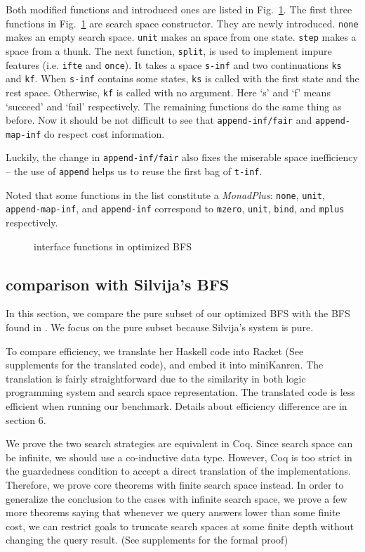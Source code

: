 \documentclass[format=acmlarge, review=true, authordraft=true]{acmart}
\begin{document}
Both modified functions and introduced ones are listed in Fig.~\ref{BFS-opt}. The first three functions in Fig.~\ref{BFS-opt} are search space constructor. They are newly introduced. \texttt{none} makes an empty search space. \texttt{unit} makes an space from one state. \texttt{step} makes a space from a thunk. The next function, \texttt{split}, is used to implement impure features (i.e. \texttt{ifte} and \texttt{once}). It takes a space \texttt{s-inf} and two continuations \texttt{ks} and \texttt{kf}. When \texttt{s-inf} contains some states, \texttt{ks} is called with the first state and the rest space. Otherwise, \texttt{kf} is called with no argument. Here `s' and `f' means `succeed' and `fail' respectively. The remaining functions do the same thing as before. Now it should be not difficult to see that \texttt{append-inf/fair} and \texttt{append-map-inf} do respect cost information.

Luckily, the change in \texttt{append-inf/fair} also fixes the miserable space inefficiency -- the use of \texttt{append} helps us to reuse the first bag of \texttt{t-inf}.

Noted that some functions in the list constitute a \emph{MonadPlus}: \texttt{none}, \texttt{unit}, \texttt{append-map-inf}, and \texttt{append-inf} correspond to \texttt{mzero}, \texttt{unit}, \texttt{bind}, and \texttt{mplus} respectively.

\begin{figure}
		
	\caption{interface functions in optimized BFS}
	\label{BFS-opt}
\end{figure}


\subsection{comparison with Silvija's BFS}

In this section, we compare the pure subset of our optimized BFS with the BFS found in \citep{seres1999algebra}. We focus on the pure subset because Silvija's system is pure. 

To compare efficiency, we translate her Haskell code into Racket (See supplements for the translated code), and embed it into miniKanren. The translation is fairly straightforward due to the similarity in both logic programming system and search space representation. The translated code is less efficient when running our benchmark. Details about efficiency difference are in section 6.

We prove the two search strategies are equivalent in Coq. Since search space can be infinite, we should use a co-inductive data type. However, Coq is too strict in the guardedness condition to accept a direct translation of the implementations. Therefore, we prove core theorems with finite search space instead. In order to generalize the conclusion to the cases with infinite search space, we prove a few more theorems saying that whenever we query answers lower than some finite cost, we can restrict goals to truncate search spaces at some finite depth without changing the query result. (See supplements for the formal proof)
\end{document}
